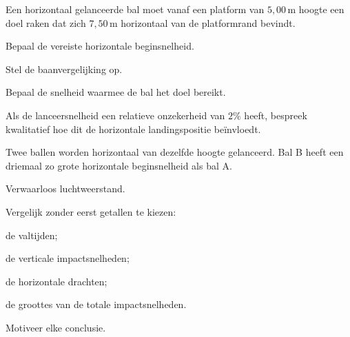 \documentclass{ximera}
\begin{document}
\begin{oefening}{\oefG}

Een horizontaal gelanceerde bal moet vanaf een platform van
$5,00\,\mathrm{m}$ hoogte een doel raken dat zich
$7,50\,\mathrm{m}$ horizontaal van de platformrand bevindt.

\begin{question}
Bepaal de vereiste horizontale beginsnelheid.
\end{question}

\begin{question}
Stel de baanvergelijking op.
\end{question}

\begin{question}
Bepaal de snelheid waarmee de bal het doel bereikt.
\end{question}

\begin{question}
Als de lanceersnelheid een relatieve onzekerheid van $2\%$ heeft,
bespreek kwalitatief hoe dit de horizontale landingspositie beïnvloedt.
\end{question}

\end{oefening}


\begin{oefening}{\oefU\ESS}

Twee ballen worden horizontaal van dezelfde hoogte gelanceerd.
Bal B heeft een driemaal zo grote horizontale beginsnelheid als bal A.

Verwaarloos luchtweerstand.

Vergelijk zonder eerst getallen te kiezen:

\begin{question}
de valtijden;
\end{question}

\begin{question}
de verticale impactsnelheden;
\end{question}

\begin{question}
de horizontale drachten;
\end{question}

\begin{question}
de groottes van de totale impactsnelheden.
\end{question}

Motiveer elke conclusie.

\end{oefening}
\end{document}
